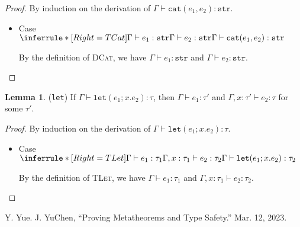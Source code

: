\documentclass{article}
\theoremstyle{definition}
\newtheorem{lemma}{Lemma}[section]
\begin{document}
\begin{proof}
    By induction on the derivation of $\Gamma\vdash \mathtt{cat}(e_1,e_2):\mathtt{str}$.
    \begin{itemize}
        \item Case $\inferrule*[Right=TCat]{\Gamma \vdash e_1:\mathtt{str} \\ \Gamma \vdash e_2:\mathtt{str}}{\Gamma \vdash \mathtt{cat}(e_1,e_2) : \mathtt{str}}$

              By the definition of \textsc{DCat}, we have $\Gamma\vdash e_1:\mathtt{str}$ and $\Gamma\vdash e_2:\mathtt{str}$.
    \end{itemize}
\end{proof}

\begin{lemma}
    (\texttt{let}) If $\Gamma\vdash \mathtt{let}(e_1;x.e_2):\tau$, then $\Gamma\vdash e_1:\tau'$ and $\Gamma,x:\tau'\vdash e_2:\tau$ for some $\tau'$.
\end{lemma}

\begin{proof}
    By induction on the derivation of $\Gamma\vdash \mathtt{let}(e_1;x.e_2):\tau$.
    \begin{itemize}
        \item Case $\inferrule*[Right=TLet]{\Gamma \vdash e_1:\tau_1 \\ \Gamma,x:\tau_1 \vdash e_2:\tau_2}{\Gamma \vdash \mathtt{let}(e_1;x.e_2) : \tau_2}$

              By the definition of \textsc{TLet}, we have $\Gamma\vdash e_1:\tau_1$ and $\Gamma,x:\tau_1 \vdash e_2:\tau_2$.
    \end{itemize}
\end{proof}

\begin{thebibliography}{9}
     Y. Yue. J. YuChen, “Proving Metatheorems and Type Safety.” Mar. 12, 2023.
\end{thebibliography}
\end{document}
